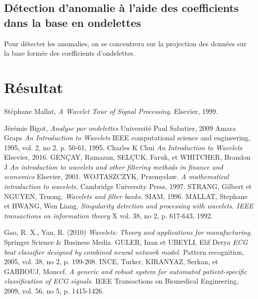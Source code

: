 \subsection{Détection d'anomalie à l'aide des coefficients dans la base en ondelettes}
Pour détecter les anomalies, on se concentrera sur la projection des données sur la base formée des coefficients d'ondelettes.
\section{Résultat}


\begin{thebibliography}{1}
	  Stéphane Mallat,
	  \emph{A Wavelet Tour of Signal Processing}.
	  Elsevier, 
	  1999.
	  
	Jérémie Bigot,
	\emph{Analyse par ondelettes}
	Université Paul Sabatier,
	2009		  
	Amara Graps
	\emph{An Introduction to Wavelets}
	 IEEE computational science and engineering, 1995, vol. 2, no 2, p. 50-61,
	 1995.
		Charles K Chui
      	\emph{An Introduction to Wavelets}
      	 Elsevier, 2016.
	GENÇAY, Ramazan, SELÇUK, Faruk, et WHITCHER, Brandon J
	 \emph{An introduction to wavelets and other filtering methods in finance and economics} 			      Elsevier, 2001.
  WOJTASZCZYK, Przemyslaw. 
  \emph{A mathematical introduction to wavelets.}
   Cambridge University Press, 1997.
	STRANG, Gilbert et NGUYEN, Truong.
	\emph{Wavelets and filter banks.}
	 SIAM, 1996.
MALLAT, Stephane et HWANG, Wen Liang.
\emph{Singularity detection and processing with wavelets. IEEE transactions on information theory} X vol. 38, no 2, p. 617-643, 1992.   

Gao, R. X., Yan, R. (2010)
\emph{Wavelets: Theory and applications for manufacturing.} 
Springer Science \& Business Media.   
%   
GULER, Inan et UBEYLI, Elif Derya
\emph{ECG beat classifier designed by combined neural network model.}
 Pattern recognition, 2005, vol. 38, no 2, p. 199-208.
INCE, Turker, KIRANYAZ, Serkan, et GABBOUJ, Moncef.
\emph{A generic and robust system for automated patient-specific classification of ECG signals.} IEEE Transactions on Biomedical Engineering, 2009, vol. 56, no 5, p. 1415-1426.

\end{thebibliography}